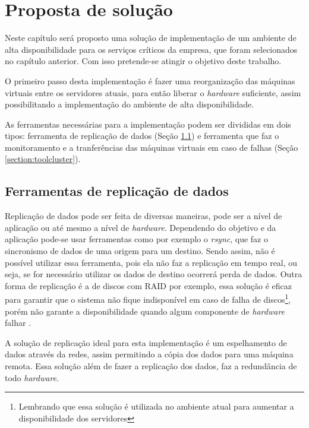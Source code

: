 \chapter{Proposta de solução}
\label{cap:propostadesolucao}

Neste capítulo será proposto uma solução de implementação de um ambiente de alta disponibilidade para os serviços críticos da empresa, que 
foram selecionados no capítulo anterior. Com isso pretende-se atingir o objetivo deste trabalho.

O primeiro passo desta implementação é fazer uma reorganização das máquinas virtuais entre os servidores atuais, para então liberar o 
\textit{hardware} suficiente, assim possibilitando a implementação do ambiente de alta disponibilidade. 

As ferramentas necessárias para a implementação podem ser divididas em dois tipos: ferramenta de replicação de dados (Seção \ref{section:toolrepl}) 
e ferramenta que faz o monitoramento e a tranferências das máquinas virtuais em caso de falhas (Seção \ref{section:toolcluster}).

\section{Ferramentas de replicação de dados}
\label{section:toolrepl}

Replicação de dados pode ser feita de diversas maneiras, pode ser a nível de aplicação ou até mesmo a nível de \textit{hardware}.
Dependendo do objetivo e da aplicação pode-se usar ferramentas como por exemplo o \textit{rsync}, que faz o sincronismo de dados de uma origem
para um destino. Sendo assim, não é possível utilizar essa ferramenta, pois ela não faz a replicação em tempo real, ou seja, se for necessário
utilizar os dados de destino ocorrerá perda de dados. Outra forma de replicação é a de discos com \ac{RAID} por exemplo, essa solução é eficaz
para garantir que o sistema não fique indisponível em caso de falha de discos\footnote{Lembrando que essa solução é utilizada no ambiente atual
para aumentar a disponibilidade dos servidores}, porém não garante a disponibilidade quando algum componente de \textit{hardware} falhar 
\cite{zaminhani2008}.

A solução de replicação ideal para esta implementação é um espelhamento de dados através da redes, assim permitindo a cópia dos dados para uma
máquina remota. Essa solução além de fazer a replicação dos dados, faz a redundância de todo \textit{hardware}.

